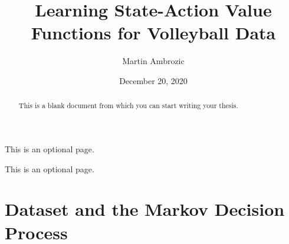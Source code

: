 \documentclass{sfuthesis}
\title{Learning State-Action Value Functions for Volleyball Data}
\author{Martin Ambrozic}
\date{December 20, 2020}
\begin{document}
	
	\frontmatter
	\maketitle{}
	\makecommittee{}
	
	\begin{abstract}
		This is a blank document from which you can start writing your thesis.
	\end{abstract}
	
	
	\begin{dedication}
		This is an optional page.
	\end{dedication}
	
	
	\begin{acknowledgements}
		This is an optional page.
	\end{acknowledgements}
	
	\tableofcontents%
	\clearpage
	
	\listoftables%
	\clearpage
	
	\listoffigures%
	\clearpage
	
	
	
	
	
	
	\mainmatter%
	
	
	
	\chapter{Dataset and the Markov Decision Process}
	
\end{document}
